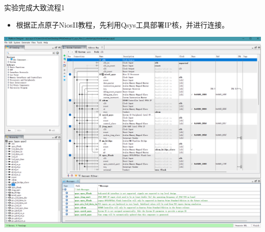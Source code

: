 \documentclass{beamer}
\begin{document}
\begin{frame}{实验完成大致流程1}
    \begin{itemize}[<+-| alert@+>]
        \item 根据正点原子NiosII教程，先利用Qsys工具部署IP核，并进行连接。
     \end{itemize}
     \pause
    \centering
    \includegraphics[width=1\textwidth]{pic/004.png}
    \label{fig:system_block_diagram}

\end{frame}
\end{document}

